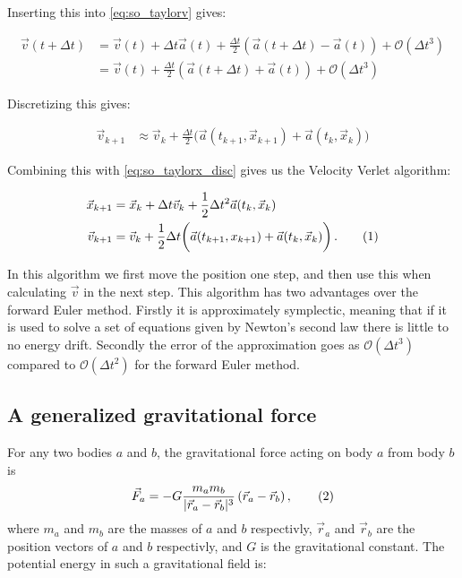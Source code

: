 \documentclass[reprint,english,notitlepage]{revtex4-1}  %
\newcommand\numberthis{\addtocounter{equation}{1}\tag{\theequation}}
\begin{document}
Inserting this into \eqref{eq:so_taylorv} gives:

\begin{align*}
\vec{v}(t+\Delta t) &= \vec{v}(t) + \Delta t \vec{a}(t) + \frac{\Delta t}{2} (\vec{a}(t+ \Delta t ) - \vec{a}(t)) + \mathcal{O}(\Delta t^3) \\
&= \vec{v}(t) + \frac{\Delta t}{2} (\vec{a}(t+ \Delta t ) + \vec{a}(t)) +  \mathcal{O}(\Delta t^3) 
\end{align*}

Discretizing this gives:

\begin{align*}
\vec{v}_{k+1} &\approx \vec{v}_k + \frac{\Delta t}{2} \bigg( \vec{a}(t_{k+1}, \vec{x}_{k+1}) + \vec{a}(t_k, \vec{x}_k) \bigg)
\end{align*}

Combining this with \eqref{eq:so_taylorx_disc} gives us the Velocity Verlet algorithm:

\begin{align*}
\vec{x}_{k+1} &= \vec{x}_k + \Delta t \vec{v}_k + \frac{1}{2} \Delta t^2 \vec{a}(t_k,\vec{x}_k) \\
\vec{v}_{k+1} &= \vec{v}_k + \frac{1}{2}\Delta t \bigg( \vec{a}(t_{k+1},x_{k+1}) + \vec{a}(t_k, \vec{x}_k) \bigg) \, . \numberthis \label{eq:VelocityVerlet}
\end{align*}

In this algorithm we first move the position one step, and then use this when calculating $\vec{v}$ in the next step. This algorithm has two advantages over the forward Euler method. Firstly it is approximately symplectic, meaning that if it is used to solve a set of equations given by Newton's second law there is little to no energy drift. Secondly the error of the approximation goes as $\mathcal{O}(\Delta t^3)$ compared to $\mathcal{O}(\Delta t^2)$ for the forward Euler method. 

\subsection{A generalized gravitational force}
For any two bodies \(a\) and \(b\), the gravitational force acting on body \(a\) from body \(b\) is
\begin{align*}
	\vec{F}_{a} = -G\frac{m_{a}m_{b}}{|\vec{r}_{a}-\vec{r}_{b}|^{3}}\left(\vec{r}_{a}-\vec{r}_{b}\right), \numberthis \label{eq:grav} \\
\end{align*}
where \(m_{a}\) and \(m_{b}\) are the masses of \(a\) and \(b\) respectivly, \(\vec{r}_{a}\) and \(\vec{r}_{b}\) are the position vectors of \(a\) and \(b\) respectivly, and \(G\) is the gravitational constant. The potential energy in such a gravitational field is:
\end{document}
